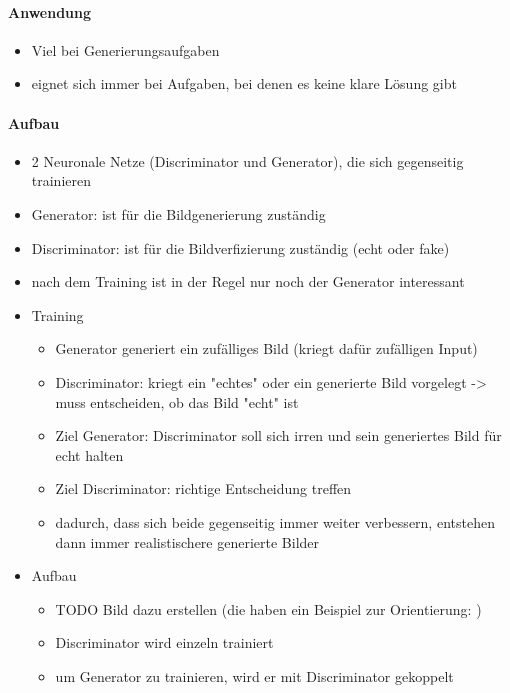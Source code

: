 \paragraph{Anwendung}
\begin{itemize}
	\item Viel bei Generierungsaufgaben
	\item eignet sich immer bei Aufgaben, bei denen es keine klare Lösung gibt
\end{itemize}


\paragraph{Aufbau \cite{gan-original-paper, hyperparameters-gan-using-genetic-algorithm}}
\begin{itemize}
	\item 2 Neuronale Netze (Discriminator und Generator), die sich gegenseitig trainieren
	\item Generator: ist für die Bildgenerierung zuständig
	\item Discriminator: ist für die Bildverfizierung zuständig (echt oder fake)
	\item nach dem Training ist in der Regel nur noch der Generator interessant
	
	\item Training
	\begin{itemize}
		\item Generator generiert ein zufälliges Bild (kriegt dafür zufälligen Input)
		\item Discriminator: kriegt ein "echtes" oder ein generierte Bild vorgelegt -> muss entscheiden, ob das Bild "echt" ist
		\item Ziel Generator: Discriminator soll sich irren und sein generiertes Bild für echt halten
		\item Ziel Discriminator: richtige Entscheidung treffen
		\item dadurch, dass sich beide gegenseitig immer weiter verbessern, entstehen dann immer realistischere generierte Bilder
	\end{itemize}

	\item Aufbau
	\begin{itemize}
		\item TODO Bild dazu erstellen (die haben ein Beispiel zur Orientierung: \cite{hyperparameters-gan-using-genetic-algorithm})
		\item Discriminator wird einzeln trainiert
		\item um Generator zu trainieren, wird er mit Discriminator gekoppelt
	\end{itemize}


\end{itemize}
